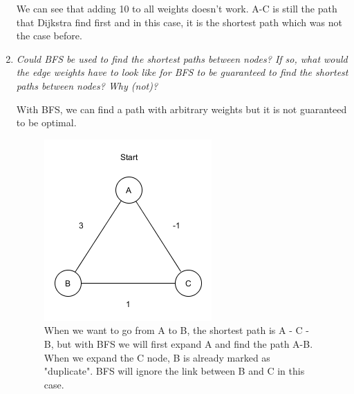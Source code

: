 \documentclass[10pt,a4paper]{article}
\begin{document}
\begin{enumerate}
We can see that adding 10 to all weights doesn't work. A-C is still the path that Dijkstra find first and in this case, it is the shortest path which was not the case before. 




\item \textit{Could BFS be used to find the shortest paths between nodes?
	If so, what would the edge weights have to look like for BFS to be guaranteed to find the
	shortest paths between nodes? Why (not)?}

With BFS, we can find a path with arbitrary weights but it is not guaranteed to be optimal. 

\begin{figure}[H]
	\centering
	\includegraphics[width=0.5\linewidth]{1c}
	\caption{When we want to go from A to B, the shortest path is A - C - B, but with BFS we will first expand A and find the path A-B. When we expand the C node, B is already marked as "duplicate". BFS will ignore the link between B and C in this case.}  
	\label{fig:1c}
\end{figure}




\end{enumerate}
\end{document}
